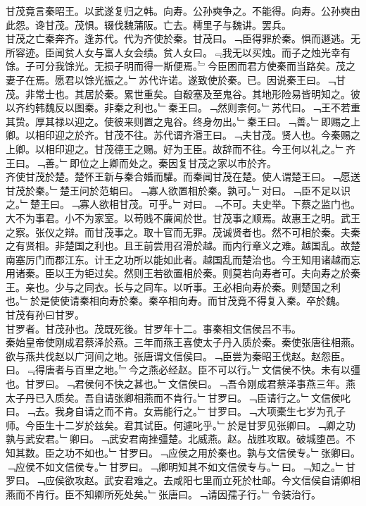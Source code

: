 \documentclass{zhvt-classic}
\begin{document}
\hspace*{2em}甘茂竟言秦昭王。以武遂复归之韩。向寿。公孙奭争之。不能得。向寿。公孙奭由此怨。谗甘茂。茂惧。辍伐魏蒲阪。亡去。樗里子与魏讲。罢兵。\\
\hspace*{2em}甘茂之亡秦奔齐。逢苏代。代为齐使於秦。甘茂曰。﹁臣得罪於秦。惧而遯逃。无所容迹。臣闻贫人女与富人女会绩。贫人女曰。﹃我无以买烛。而子之烛光幸有馀。子可分我馀光。无损子明而得一斯便焉。﹄今臣困而君方使秦而当路矣。茂之妻子在焉。愿君以馀光振之。﹂苏代许诺。遂致使於秦。已。因说秦王曰。﹁甘茂。非常士也。其居於秦。累世重矣。自殽塞及至鬼谷。其地形险易皆明知之。彼以齐约韩魏反以图秦。非秦之利也。﹂秦王曰。﹁然则柰何。﹂苏代曰。﹁王不若重其贽。厚其禄以迎之。使彼来则置之鬼谷。终身勿出。﹂秦王曰。﹁善。﹂即赐之上卿。以相印迎之於齐。甘茂不往。苏代谓齐湣王曰。﹁夫甘茂。贤人也。今秦赐之上卿。以相印迎之。甘茂德王之赐。好为王臣。故辞而不往。今王何以礼之。﹂齐王曰。﹁善。﹂即位之上卿而处之。秦因复甘茂之家以市於齐。\\
\hspace*{2em}齐使甘茂於楚。楚怀王新与秦合婚而驩。而秦闻甘茂在楚。使人谓楚王曰。﹁愿送甘茂於秦。﹂楚王问於范蜎曰。﹁寡人欲置相於秦。孰可。﹂对曰。﹁臣不足以识之。﹂楚王曰。﹁寡人欲相甘茂。可乎。﹂对曰。﹁不可。夫史举。下蔡之监门也。大不为事君。小不为家室。以苟贱不廉闻於世。甘茂事之顺焉。故惠王之明。武王之察。张仪之辩。而甘茂事之。取十官而无罪。茂诚贤者也。然不可相於秦。夫秦之有贤相。非楚国之利也。且王前尝用召滑於越。而内行章义之难。越国乱。故楚南塞厉门而郡江东。计王之功所以能如此者。越国乱而楚治也。今王知用诸越而忘用诸秦。臣以王为钜过矣。然则王若欲置相於秦。则莫若向寿者可。夫向寿之於秦王。亲也。少与之同衣。长与之同车。以听事。王必相向寿於秦。则楚国之利也。﹂於是使使请秦相向寿於秦。秦卒相向寿。而甘茂竟不得复入秦。卒於魏。\\
\hspace*{2em}甘茂有孙曰甘罗。\\
\hspace*{2em}甘罗者。甘茂孙也。茂既死後。甘罗年十二。事秦相文信侯吕不韦。\\
\hspace*{2em}秦始皇帝使刚成君蔡泽於燕。三年而燕王喜使太子丹入质於秦。秦使张唐往相燕。欲与燕共伐赵以广河间之地。张唐谓文信侯曰。﹁臣尝为秦昭王伐赵。赵怨臣。曰。﹃得唐者与百里之地。﹄今之燕必经赵。臣不可以行。﹂文信侯不快。未有以彊也。甘罗曰。﹁君侯何不快之甚也。﹂文信侯曰。﹁吾令刚成君蔡泽事燕三年。燕太子丹已入质矣。吾自请张卿相燕而不肯行。﹂甘罗曰。﹁臣请行之。﹂文信侯叱曰。﹁去。我身自请之而不肯。女焉能行之。﹂甘罗曰。﹁大项橐生七岁为孔子师。今臣生十二岁於兹矣。君其试臣。何遽叱乎。﹂於是甘罗见张卿曰。﹁卿之功孰与武安君。﹂卿曰。﹁武安君南挫彊楚。北威燕。赵。战胜攻取。破城堕邑。不知其数。臣之功不如也。﹂甘罗曰。﹁应侯之用於秦也。孰与文信侯专。﹂张卿曰。﹁应侯不如文信侯专。﹂甘罗曰。﹁卿明知其不如文信侯专与。﹂曰。﹁知之。﹂甘罗曰。﹁应侯欲攻赵。武安君难之。去咸阳七里而立死於杜邮。今文信侯自请卿相燕而不肯行。臣不知卿所死处矣。﹂张唐曰。﹁请因孺子行。﹂令装治行。\\
\end{document}
